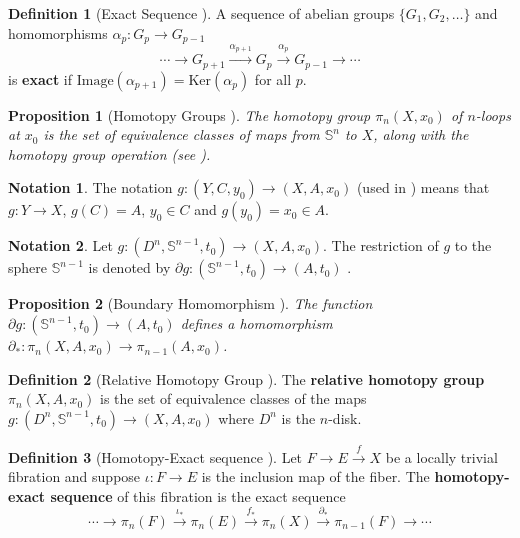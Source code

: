 \documentclass[12pt]{article}
\newtheorem{prop}{Proposition}
\theoremstyle{definition}
\newtheorem{defn}{Definition}
\newtheorem*{notation}{Notation}
\begin{document}
\begin{defn}[Exact Sequence \cite{intro-top-manifolds}]
    A sequence of abelian groups \(\{G_1, G_2, \ldots\}\) and
    homomorphisms \(\alpha_p : G_p \rightarrow G_{p-1}\)
    \[
        \cdots \rightarrow G_{p+1} \xrightarrow{\alpha_{p+1}} G_p
    \xrightarrow{\alpha_p} G_{p-1} \rightarrow \cdots
    \]
    is \textbf{exact} if \(\text{Image}(\alpha_{p+1}) = \text{Ker}(\alpha_p)\)
    for all \(p\).
\end{defn}

\begin{prop}[Homotopy Groups \cite{topology-fiber-bundles}]
    The homotopy group \(\pi_n(X,x_0)\) of \(n\)-loops at \(x_0\) is the
    set of equivalence classes of maps from \(\mathbb{S}^n\) to \(X\), along
    with the homotopy group operation (see \cite{intro-top-manifolds}).
\end{prop}

\begin{notation}
    The notation \(g : (Y,C,y_0) \rightarrow (X,A,x_0)\) (used in 
    \cite{topology-fiber-bundles}) means that \(g : Y \rightarrow X\), 
    \(g(C) = A\), \(y_0 \in C\) and \(g(y_0) = x_0 \in A\).
\end{notation}

\begin{notation}
    Let \(g : (D^n, \mathbb{S}^{n-1},t_0) \rightarrow (X,A,x_0)\). 
    The restriction of \(g\) to the sphere \(\mathbb{S}^{n-1}\) is denoted by 
    \(\partial g : (\mathbb{S}^{n-1},t_0) \rightarrow (A,t_0)\)
    \cite{topology-fiber-bundles}.
\end{notation}

\begin{prop}[Boundary Homomorphism \cite{topology-fiber-bundles}]
    The function \(\partial g : (\mathbb{S}^{n-1},t_0) \rightarrow (A,t_0)\)
    defines a homomorphism 
    \(\partial_* : \pi_n(X,A,x_0) \rightarrow \pi_{n-1}(A,x_0)\).
\end{prop}

\begin{defn}[Relative Homotopy Group \cite{topology-fiber-bundles}]
    The \textbf{relative homotopy group} \(\pi_n(X,A,x_0)\) 
    is the set of equivalence classes
    of the maps \(g : (D^n,\mathbb{S}^{n-1},t_0) \rightarrow (X, A, x_0)\)
    where \(D^n\) is the \(n\)-disk.
\end{defn}

\begin{defn}[Homotopy-Exact sequence \cite{topology-fiber-bundles}]
    Let \(F \rightarrow E \xrightarrow{f} X\) be a locally trivial fibration and suppose
    \(\iota : F \rightarrow E\) is the inclusion map of the fiber.
    The \textbf{homotopy-exact sequence} of this fibration is the exact sequence
    \[
        \cdots \rightarrow \pi_n(F) \xrightarrow{\iota_*} \pi_n(E) 
        \xrightarrow{f_*} \pi_n(X) \xrightarrow{\partial_*} \pi_{n-1}(F)
        \rightarrow \cdots
    \]
\end{defn}
\end{document}
